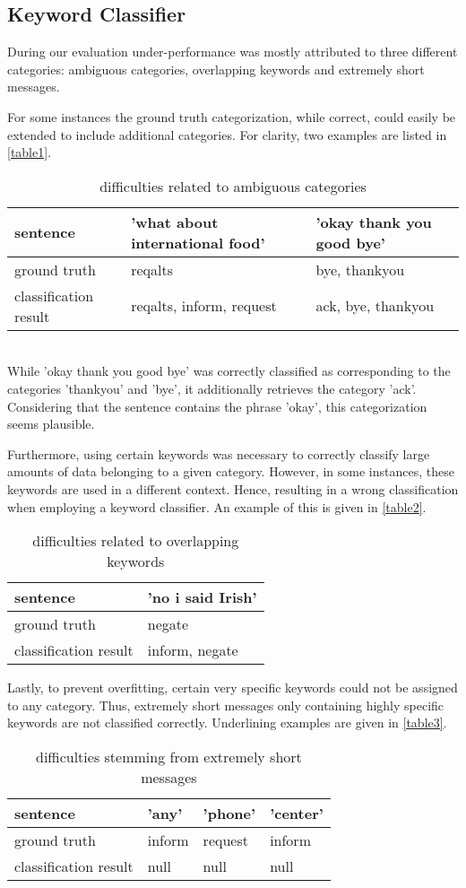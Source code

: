\documentclass[a4paper]{article}
\begin{document}
\subsection{Keyword Classifier}
\label{keyword}
During our evaluation under-performance was mostly attributed to three different categories: ambiguous categories, overlapping keywords and extremely short messages. 

For some instances the ground truth categorization, while correct, could easily be extended to include additional categories. For clarity, two examples are listed in \autoref{table1}. 
\begin{table}[h!]
    \centering
    \begin{tabular}{l|l|l}
     sentence & 'what about international food' & 'okay thank you good bye' \\ \hline
     ground truth & reqalts & bye, thankyou \\ \hline
     classification result & reqalts, inform, request & ack, bye, thankyou
    \end{tabular}
    \caption{difficulties related to ambiguous categories}
    \label{table1}
\end{table}{} \\
While 'okay thank you good bye' was correctly classified as corresponding to the categories 'thankyou' and 'bye', it additionally retrieves the category 'ack'. Considering that the sentence contains the phrase 'okay', this categorization seems plausible. 

Furthermore, using certain keywords was necessary to correctly classify large amounts of data belonging to a given category. However, in some instances, these keywords are used in a different context. Hence, resulting in a wrong classification when employing a keyword classifier. An example of this is given in \autoref{table2}.\\
\begin{table}[h!]
    \centering
    \begin{tabular}{l|l}
     sentence & 'no i said Irish' \\ \hline
     ground truth & negate  \\ \hline
     classification result & inform, negate 
    \end{tabular}
    \caption{difficulties related to overlapping keywords}
    \label{table2}
\end{table}{}

Lastly, to prevent overfitting, certain very specific keywords could not be assigned to any category. Thus, extremely short messages only containing highly specific keywords are not classified correctly. Underlining examples are given in \autoref{table3}.
\begin{table}[h!]
    \centering
    \begin{tabular}{l|l|l|l}
     sentence & 'any' & 'phone' & 'center'\\ \hline
     ground truth & inform & request & inform\\ \hline
     classification result & null & null & null  
    \end{tabular}
    \caption{difficulties stemming from extremely short messages}
    \label{table3}
\end{table}{}
\end{document}
